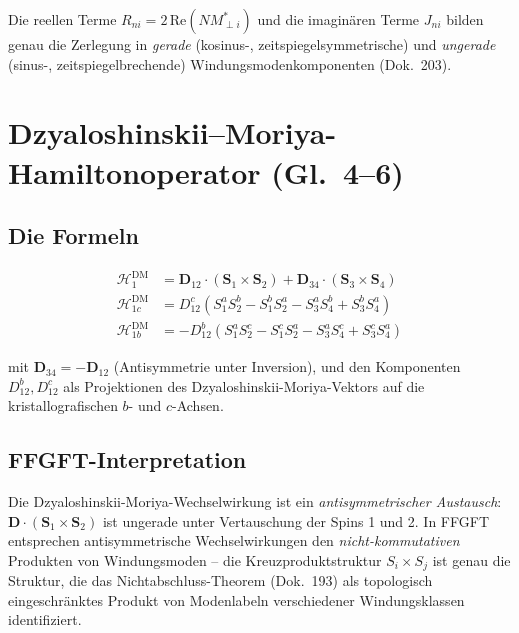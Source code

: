 Die reellen Terme $R_{ni} = 2\,\mathrm{Re}(NM_{\perp i}^*)$ und die
imaginären Terme $J_{ni}$ bilden genau die Zerlegung in
\emph{gerade} (kosinus-, zeitspiegelsymmetrische) und \emph{ungerade}
(sinus-, zeitspiegelbrechende) Windungsmodenkomponenten (Dok.~203).

\section{Dzyaloshinskii--Moriya-Hamiltonoperator (Gl.~4--6)}

\subsection*{Die Formeln}

\begin{align}
  \mathcal{H}_1^{\mathrm{DM}} &= \mathbf{D}_{12}\cdot(\mathbf{S}_1\times\mathbf{S}_2)
    + \mathbf{D}_{34}\cdot(\mathbf{S}_3\times\mathbf{S}_4)
  \tag{Ref.~Gl.~4} \\[6pt]
  \mathcal{H}_{1c}^{\mathrm{DM}} &= D_{12}^c
    (S_1^a S_2^b - S_1^b S_2^a - S_3^a S_4^b + S_3^b S_4^a)
  \tag{Ref.~Gl.~5} \\[6pt]
  \mathcal{H}_{1b}^{\mathrm{DM}} &= -D_{12}^b
    (S_1^a S_2^c - S_1^c S_2^a - S_3^a S_4^c + S_3^c S_4^a)
  \tag{Ref.~Gl.~6}
\end{align}

\noindent mit $\mathbf{D}_{34} = -\mathbf{D}_{12}$ (Antisymmetrie unter
Inversion), und den Komponenten $D_{12}^b, D_{12}^c$ als Projektionen des
Dzyaloshinskii-Moriya-Vektors auf die kristallografischen $b$- und $c$-Achsen.

\subsection*{FFGFT-Interpretation}

Die Dzyaloshinskii-Moriya-Wechselwirkung ist ein
\emph{antisymmetrischer Austausch}: $\mathbf{D}\cdot(\mathbf{S}_1\times\mathbf{S}_2)$
ist ungerade unter Vertauschung der Spins 1 und 2. In FFGFT entsprechen
antisymmetrische Wechselwirkungen den \emph{nicht-kommutativen} Produkten von
Windungsmoden -- die Kreuzproduktstruktur $S_i\times S_j$ ist genau die
Struktur, die das Nichtabschluss-Theorem (Dok.~193) als topologisch
eingeschränktes Produkt von Modenlabeln verschiedener Windungsklassen
identifiziert.

